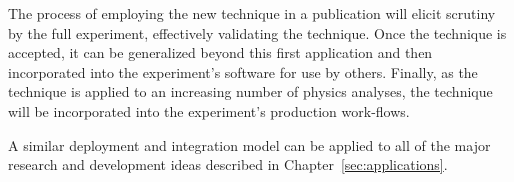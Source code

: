 The process of employing the new technique in a publication will elicit scrutiny by the full experiment, effectively validating the technique. Once the technique is accepted, it can be generalized beyond this first application and then incorporated into the experiment's software for use by others. Finally, as the technique is applied to an increasing number of physics analyses, the technique will be incorporated into the experiment's production work-flows.

A similar deployment and integration model can be applied to all of the major research and development ideas described in Chapter~\ref{sec:applications}.


